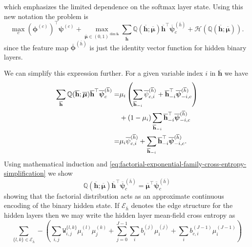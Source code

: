 \documentclass{article} %
\begin{document}
which emphasizes the limited dependence on the softmax layer state.  Using this new notation the problem is
\begin{equation}\label{eq:best-guess-mean-field-3}
\max_c \left(\boldsymbol{\phi}^{(c)}\right)^\top \boldsymbol{\psi}^{(c)} + \max_{\overline{\boldsymbol{\mu}}\in (0,1)^{\dim \overline{\mathbf{h}}}} \sum_{\overline{\mathbf{h}}} \mathbb{Q}(\overline{\mathbf{h}};\overline{\boldsymbol{\mu}})
\overline{\mathbf{h}}^\top \overline{\boldsymbol{\psi}}^{(\overline{h})}_c
 + \mathcal{H}(\mathbb{Q}(\overline{\mathbf{h}};\overline{\boldsymbol{\mu}})).
\end{equation}
since the feature map $\overline{\boldsymbol{\phi}}^{(\overline{h})}$
is just the identity vector function for hidden binary layers.

We can simplify this expression further.
For a given variable index $i$ in $\overline{\mathbf{h}}$ we have
\begin{align}\label{eq:factorial-exponential-family-cross-entropy-simplification}
\sum_{\overline{\mathbf{h}}}\mathbb{Q}(\overline{\mathbf{h}};\overline{\boldsymbol{\mu}})
\overline{\mathbf{h}}^\top \overline{\boldsymbol{\psi}}^{(\overline{h})}_c =&
  \mu_i \left(\sum_{\overline{\mathbf{h}}_{-i}} \overline{\psi}^{(\overline{h})}_{c,i} + \overline{\mathbf{h}}^\top_{-i} \overline{\boldsymbol{\psi}}^{(\overline{h})}_{-i,c} \right)\notag\\
& + (1-\mu_i) \sum_{\overline{\mathbf{h}}_{-i}} \overline{\mathbf{h}}^\top_{-i} \overline{\boldsymbol{\psi}}^{(\overline{h})}_{-i,c} \notag\\
=& \mu_i \overline{\psi}^{(\overline{h})}_{c,i} + \sum_{\overline{\mathbf{h}}_{-i}} \overline{\mathbf{h}}^\top_{-i} \overline{\boldsymbol{\psi}}^{(\overline{h})}_{-i,c}.
\end{align}
Using mathematical induction and \autoref{eq:factorial-exponential-family-cross-entropy-simplification} we show
\begin{equation}\label{eq:mean-field-energy}
\mathbb{Q}(\overline{\mathbf{h}};\overline{\boldsymbol{\mu}})
\overline{\mathbf{h}}^\top \overline{\boldsymbol{\psi}}^{(\overline{h})}_c = \overline{\boldsymbol{\mu}}^\top \overline{\boldsymbol{\psi}}^{(\overline{h})}_c
\end{equation}
showing that the factorial distribution acts as an approximate continuous encoding of the binary hidden state.  If $\mathcal{E}_{\overline{h}}$
denotes the edge structure for the hidden layers then we may write the hidden layer mean-field cross entropy as
\begin{equation}\label{eq:mean-field-cross-entropy-summation}
\sum_{\{l,k\}\in\mathcal{E}_{\overline{h}}} -\left(\sum_{i,j} \mathtt{W}_{i,j}^{\{l,k\}}\mu^{(l)}_i\mu^{(k)}_j + \sum_{j=0}^{J-1} \sum_i b_{i}^{(j)}\mu_i^{(j)} + \sum_i b_{c,i}^{(J-1)} \mu_i^{(J-1)}\right)
\end{equation}
\end{document}
